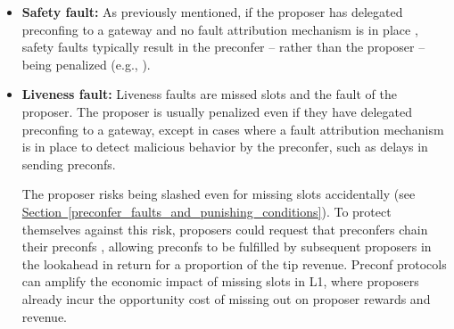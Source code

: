 \documentclass[a4paper]{article}
\theoremstyle{boldstyle}
\newcommand{\ks}[1]{\textcolor{purple}{\textbf{Katerina:} #1}}
\begin{document}
            \begin{itemize}
                \item \textbf{Safety fault:} As previously mentioned, if the proposer has delegated preconfing to a gateway and no fault attribution mechanism is in place \cite{W:FaultAttribution}, safety faults typically result in the preconfer -- rather than the proposer -- being penalized (e.g., \cite{gateway_trust_liveness}).
                

                \item \textbf{Liveness fault:} Liveness faults are missed slots and the fault of the proposer. The proposer is usually penalized even if they have delegated preconfing to a gateway, except in cases where a fault attribution mechanism is in place to detect malicious behavior by the preconfer, such as delays in sending preconfs. \par
                The proposer risks being slashed even for missing slots accidentally (see \hyperref[preconfer_faults_and_punishing_conditions]{Section~\ref{preconfer_faults_and_punishing_conditions}}). To protect themselves against this risk, proposers could request that preconfers chain their preconfs \cite{W:AvoidingAccidentalLivenessFaultsforBasedPreconfs}, allowing preconfs to be fulfilled by subsequent proposers in the lookahead in return for a proportion of the tip revenue. Preconf protocols can amplify the economic impact of missing slots in L1, where proposers already incur the opportunity cost of missing out on proposer rewards and revenue.
            \end{itemize}
\end{document}
